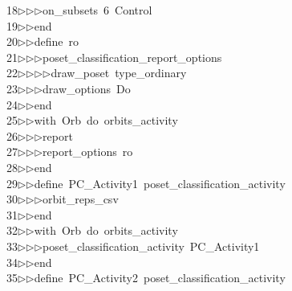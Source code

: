\begin{tabbing}
18\>$\triangleright$\>$\triangleright$\>$\triangleright$\>on\_subsets\ 6\ Control\ \\[0pt]
19\>$\triangleright$\>$\triangleright$\>end\ \\[0pt]
20\>$\triangleright$\>$\triangleright$\>define\ ro\ \\[0pt]
21\>$\triangleright$\>$\triangleright$\>$\triangleright$\>poset\_classification\_report\_options\ \\[0pt]
22\>$\triangleright$\>$\triangleright$\>$\triangleright$\>$\triangleright$\>draw\_poset\ type\_ordinary\ \\[0pt]
23\>$\triangleright$\>$\triangleright$\>$\triangleright$\>draw\_options\ Do\ \\[0pt]
24\>$\triangleright$\>$\triangleright$\>end\ \\[0pt]
25\>$\triangleright$\>$\triangleright$\>with\ Orb\ do\ orbits\_activity\ \\[0pt]
26\>$\triangleright$\>$\triangleright$\>$\triangleright$\>report\ \ \\[0pt]
27\>$\triangleright$\>$\triangleright$\>$\triangleright$\>report\_options\ ro\ \\[0pt]
28\>$\triangleright$\>$\triangleright$\>end\ \\[0pt]
29\>$\triangleright$\>$\triangleright$\>define\ PC\_Activity1\ poset\_classification\_activity\ \\[0pt]
30\>$\triangleright$\>$\triangleright$\>$\triangleright$\>orbit\_reps\_csv\ \\[0pt]
31\>$\triangleright$\>$\triangleright$\>end\ \\[0pt]
32\>$\triangleright$\>$\triangleright$\>with\ Orb\ do\ orbits\_activity\ \\[0pt]
33\>$\triangleright$\>$\triangleright$\>$\triangleright$\>poset\_classification\_activity\ PC\_Activity1\ \\[0pt]
34\>$\triangleright$\>$\triangleright$\>end\\[0pt]
35\>$\triangleright$\>$\triangleright$\>define\ PC\_Activity2\ poset\_classification\_activity\ \\[0pt]

\end{tabbing}
